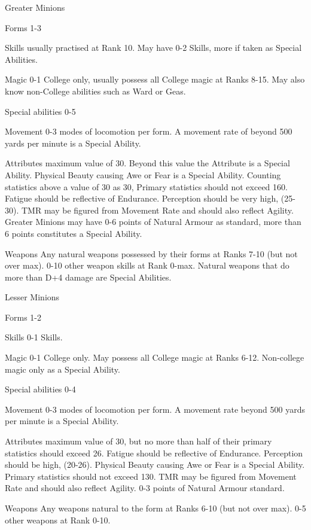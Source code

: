 \begin{Description}
\item[Greater Minions]

\begin{Description}
\item[Forms] 1-3 
\item[Skills] usually practised at Rank 10.  May have 0-2 Skills, more if taken as Special Abilities.
\item[Magic] 0-1 College only, usually possess all College magic at Ranks 8-15. May also know non-College abilities such as Ward or Geas.
\item[Special abilities] 0-5
\item[Movement] 0-3 modes of locomotion per form.  A movement rate of beyond 500 yards per minute is a Special Ability.
\item[Attributes] maximum value of 30.  Beyond this value the Attribute is a Special Ability.  Physical Beauty causing Awe or Fear is a Special Ability.  Counting statistics above a value of 30 as 30, Primary statistics should not exceed 160.  Fatigue should be reflective of Endurance.  Perception should be very high, (25-30). TMR may be figured from Movement Rate and should also reflect Agility.  Greater Minions may have 0-6 points of Natural Armour as standard, more than 6 points constitutes a Special Ability.
\item[Weapons] Any natural weapons possessed by their forms at Ranks 7-10 (but not over max).  0-10 other weapon skills at Rank 0-max. Natural weapons that do more than D+4 damage are Special Abilities.
\end{Description}

\item[Lesser Minions]
\begin{Description}
\item[Forms] 1-2
\item[Skills] 0-1 Skills.
\item[Magic] 0-1 College only.  May possess all College magic at Ranks 6-12. Non-college magic only as a Special Ability.
\item[Special abilities] 0-4 
\item[Movement] 0-3 modes of locomotion per form.  A movement rate beyond 500 yards per minute is a Special Ability.
\item[Attributes] maximum value of 30, but no more than half of their primary statistics should exceed 26.  Fatigue should be reflective of Endurance.  Perception should be high, (20-26). Physical Beauty causing Awe or Fear is a Special Ability.  Primary statistics should not exceed 130.  TMR may be figured from Movement Rate and should also reflect Agility.  0-3 points of Natural Armour standard.
\item[Weapons] Any weapons natural to the form at Ranks 6-10 (but not over max).  0-5 other weapons at Rank 0-10.
\end{Description}


\end{Description}
